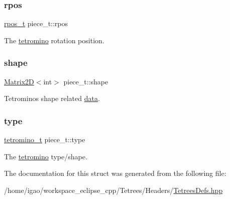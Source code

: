 \subsubsection{\texorpdfstring{rpos}{rpos}}
{\footnotesize\ttfamily \hyperlink{TetreesDefs_8hpp_ae8c3bf9765f183eabf1106110513afc6}{rpos\+\_\+t} piece\+\_\+t\+::rpos}

The \hyperlink{TetreesDefs_8hpp_adf4f8e2cbbd7d8894fe3beda39db1b8f}{tetromino} rotation position. \mbox{\label{structpiece__t_a3c8f9c2e51c6bab728e564143c439746}} 
\subsubsection{\texorpdfstring{shape}{shape}}
{\footnotesize\ttfamily \hyperlink{classMatrix2D}{Matrix2D}$<$int$>$ piece\+\_\+t\+::shape}

Tetromino\textquotesingle{}s shape related \hyperlink{classTetreesUtils_acb377319f6772d9e88f677273c895912}{data}. \mbox{\label{structpiece__t_ac5cbbdb5ff335128af8ca9f491a4f543}} 
\subsubsection{\texorpdfstring{type}{type}}
{\footnotesize\ttfamily \hyperlink{TetreesDefs_8hpp_acd279a62a49ecee418dd808ac39a1795}{tetromino\+\_\+t} piece\+\_\+t\+::type}

The \hyperlink{TetreesDefs_8hpp_adf4f8e2cbbd7d8894fe3beda39db1b8f}{tetromino} type/shape. 

The documentation for this struct was generated from the following file\+:\begin{DoxyCompactItemize}
\item 
/home/igao/workspace\+\_\+eclipse\+\_\+cpp/\+Tetrees/\+Headers/\hyperlink{TetreesDefs_8hpp}{Tetrees\+Defs.\+hpp}\end{DoxyCompactItemize}
